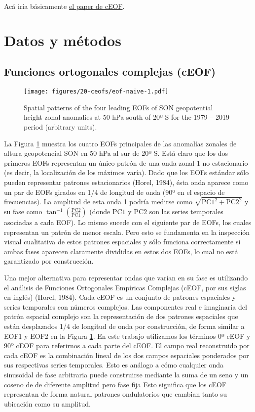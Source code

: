 \documentclass[12pt,oneside]{reedthesis}
\begin{document}
Acá iría básicamente \href{https://github.com/eliocamp/shceof}{el paper de cEOF}.

\hypertarget{datos-y-muxe9todos}{%
\section{Datos y métodos}\label{datos-y-muxe9todos}}

\hypertarget{funciones-ortogonales-complejas-ceof}{%
\subsection{Funciones ortogonales complejas (cEOF)}\label{funciones-ortogonales-complejas-ceof}}


\begin{figure}
\centering
\texttt{[image: figures/20-ceofs/eof-naive-1.pdf]}
\caption{\label{fig:eof-naive}Spatial patterns of the four leading EOFs of SON geopotential height zonal anomalies at 50 hPa south of 20º S for the 1979 -- 2019 period (arbitrary units).}
\end{figure}
La Figura \ref{fig:eof-naive} muestra los cuatro EOFs principales de las anomalías zonales de altura geopotencial SON en 50 hPa al sur de 20º S.
Está claro que los dos primeros EOFs representan un único patrón de una onda zonal 1 no estacionario (es decir, la localización de los máximos varía).
Dado que los EOFs estándar sólo pueden representar patrones estacionarios (Horel, 1984), ésta onda aparece como un par de EOFs girados en 1/4 de longitud de onda (90º en el espacio de frecuencias).
La amplitud de esta onda 1 podría medirse como \(\sqrt{\mathrm{PC1}^2 + \mathrm{PC2}^2}\) y su fase como \(\tan^{-1} \left ( \frac{\mathrm{PC2}}{\mathrm{PC1}} \right )\) (donde \(\mathrm{PC1}\) y \(\mathrm{PC2}\) son las series temporales asociadas a cada EOF).
Lo mismo sucede con el siguiente par de EOFs, los cuales representan un patrón de menor escala.
Pero esto se fundamenta en la inspección visual cualitativa de estos patrones espaciales y sólo funciona correctamente si ambas fases aparecen claramente divididas en estos dos EOFs, lo cual no está garantizado por construcción.

Una mejor alternativa para representar ondas que varían en su fase es utilizando el análisis de Funciones Ortogonales Empíricas Complejas (cEOF, por sus siglas en inglés) (Horel, 1984).
Cada cEOF es un conjunto de patrones espaciales y series temporales con números complejos.
Las componentes real e imaginaria del patrón espacial complejo son la representación de dos patrones espaciales que están desplazados 1/4 de longitud de onda por construcción, de forma similar a EOF1 y EOF2 en la Figura \ref{fig:eof-naive}.
En este trabajo utilizamos los términos 0º cEOF y 90º cEOF para referirnos a cada parte del cEOF.
El campo real reconstruido por cada cEOF es la combinación lineal de los dos campos espaciales ponderados por sus respectivas series temporales.
Esto es análogo a cómo cualquier onda sinusoidal de fase arbitraria puede construirse mediante la suma de un seno y un coseno de de diferente amplitud pero fase fija
Esto significa que los cEOF representan de forma natural patrones ondulatorios que cambian tanto su ubicación como su amplitud.
\end{document}
